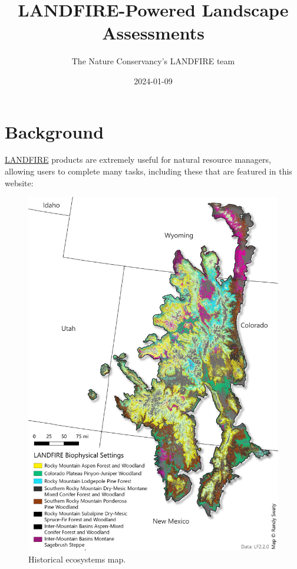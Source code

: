 \documentclass[
  letterpaper,
  DIV=11,
  numbers=noendperiod]{scrreprt}
\title{LANDFIRE-Powered Landscape Assessments}
\author{The Nature Conservancy's LANDFIRE team}
\date{2024-01-09}
\renewcommand*\contentsname{Table of contents}
\newcommand\contentsname{Table of contents}
\begin{document}
\maketitle
\ifdefined\Shaded\renewenvironment{Shaded}{\begin{tcolorbox}[sharp corners, boxrule=0pt, enhanced, interior hidden, borderline west={3pt}{0pt}{shadecolor}, breakable, frame hidden]}{\end{tcolorbox}}\fi

\renewcommand*\contentsname{Table of contents}
{
\hypersetup{linkcolor=}
\setcounter{tocdepth}{2}
\tableofcontents
}

\hypertarget{background}{%
\chapter*{Background}\label{background}}


\href{https://landfire.gov/index.php}{LANDFIRE} products are extremely
useful for natural resource managers, allowing users to complete many
tasks, including these that are featured in this website:

\begin{figure}

{\centering \includegraphics{images/bps.jpg}

}

\caption{Historical ecosystems map.}

\end{figure}
\end{document}
